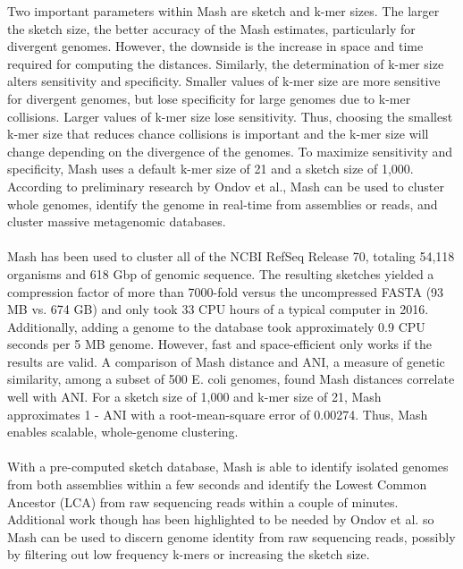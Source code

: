 \documentclass[12pt, letterpaper]{article}
\begin{document}
\FloatBarrier
Two important parameters within Mash are sketch and k-mer sizes. The larger the sketch size, the better accuracy of the Mash estimates, particularly for divergent genomes. However, the downside is the increase in space and time required for computing the distances. Similarly, the determination of k-mer size alters sensitivity and specificity. Smaller values of k-mer size are more sensitive for divergent genomes, but lose specificity for large genomes due to k-mer collisions. Larger values of k-mer size lose sensitivity. Thus, choosing the smallest k-mer size that reduces chance collisions is important and the k-mer size will change depending on the divergence of the genomes. To maximize sensitivity and specificity, Mash uses a default k-mer size of 21 and a sketch size of 1,000. According to preliminary research by Ondov et al., Mash can be used to cluster whole genomes, identify the genome in real-time  from assemblies or reads, and cluster massive metagenomic databases. \\ \\
Mash has been used to cluster all of the NCBI RefSeq Release 70, totaling 54,118 organisms and 618 Gbp of genomic sequence. The resulting sketches yielded a compression factor of more than 7000-fold versus the uncompressed FASTA (93 MB vs. 674 GB) and only took 33 CPU hours of a typical computer in 2016. Additionally, adding a genome to the database took approximately 0.9 CPU seconds per 5 MB genome. However, fast and space-efficient only works if the results are valid. A comparison of Mash distance and ANI, a  measure of genetic similarity, among a subset of 500 E. coli genomes, found Mash distances correlate well with ANI. For a sketch size of 1,000 and k-mer size of 21, Mash approximates 1 - ANI with a root-mean-square error of 0.00274. Thus, Mash enables scalable, whole-genome clustering. \\ \\
With a pre-computed sketch database, Mash is able to identify isolated genomes from both assemblies within a few seconds and identify the Lowest Common Ancestor (LCA) from raw sequencing reads within a couple of minutes. Additional work though has been highlighted to be needed by Ondov et al. so Mash can be used to discern genome identity from raw sequencing reads, possibly by filtering out low frequency k-mers or increasing the sketch size. \\ \\
\end{document}
